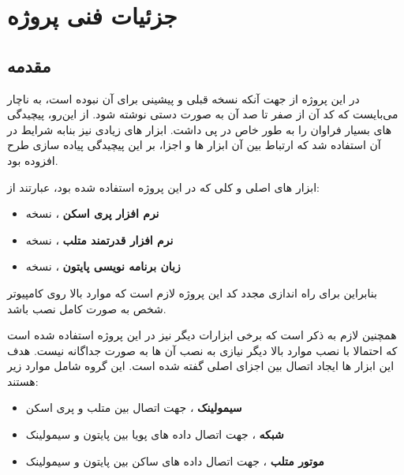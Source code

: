 \chapter{جزئیات فنی پروژه}


\section{مقدمه}
در این پروژه از جهت آنکه نسخه قبلی و پیشینی برای  آن نبوده است، به ناچار می‌بایست که کد آن از صفر تا صد آن به صورت دستی نوشته شود. از این‌رو، پیچیدگی های بسیار فراوان را به طور خاص در پی داشت. ابزار های زیادی نیز بنابه شرایط در آن استفاده شد که ارتباط بین آن ابزار ها و اجزا، بر این پیچیدگی پیاده سازی طرح افزوده بود.

ابزار های اصلی و کلی که در این پروژه استفاده شده بود، عبارتند از:

\begin{itemize}
	\item 
	\textbf{نرم افزار پری اسکن}
	، نسخه 
	
	\item 
	\textbf{نرم افزار قدرتمند متلب}
	، نسخه 
	\item 
	\textbf{زبان برنامه نویسی پایتون}
	، نسخه 
\end{itemize}

بنابراین برای راه اندازی مجدد کد این پروژه لازم است که موارد بالا روی کامپیوتر شخص به صورت کامل نصب باشد.

همچنین لازم به ذکر است که برخی ابزارات دیگر نیز در این پروژه استفاده شده است که احتمالا با نصب موارد بالا دیگر نیازی به نصب آن ها به صورت جداگانه نیست. هدف این ابزار ها ایجاد اتصال بین اجزای اصلی گفته شده است. این گروه شامل موارد زیر هستند:

\begin{itemize}
	\item 
	\textbf{سیمولینک}
	، جهت اتصال بین متلب و پری اسکن
	
	\item 
	\textbf{شبکه }
	، جهت اتصال داده های پویا 
	بین پایتون و سیمولینک
	
	\item 
	\textbf{موتور متلب}
	\LTRfootnote{\matlabengine}
	، جهت اتصال داده های ساکن
	بین پایتون و سیمولینک
\end{itemize}


